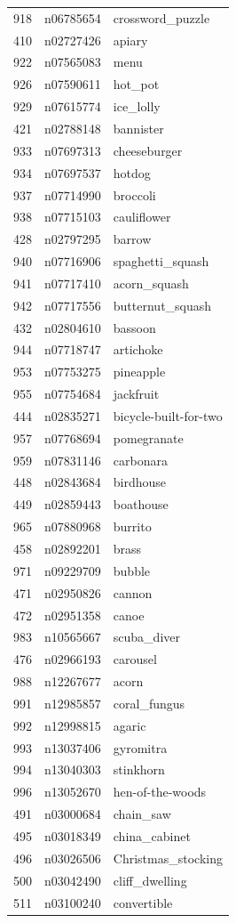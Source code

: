 \begin{table}
\begin{tabular}{cll}
918 & n06785654 & crossword_puzzle \\
410 & n02727426 & apiary \\
922 & n07565083 & menu \\
926 & n07590611 & hot_pot \\
929 & n07615774 & ice_lolly \\
421 & n02788148 & bannister \\
933 & n07697313 & cheeseburger \\
934 & n07697537 & hotdog \\
937 & n07714990 & broccoli \\
938 & n07715103 & cauliflower \\
428 & n02797295 & barrow \\
940 & n07716906 & spaghetti_squash \\
941 & n07717410 & acorn_squash \\
942 & n07717556 & butternut_squash \\
432 & n02804610 & bassoon \\
944 & n07718747 & artichoke \\
953 & n07753275 & pineapple \\
955 & n07754684 & jackfruit \\
444 & n02835271 & bicycle-built-for-two \\
957 & n07768694 & pomegranate \\
959 & n07831146 & carbonara \\
448 & n02843684 & birdhouse \\
449 & n02859443 & boathouse \\
965 & n07880968 & burrito \\
458 & n02892201 & brass \\
971 & n09229709 & bubble \\
471 & n02950826 & cannon \\
472 & n02951358 & canoe \\
983 & n10565667 & scuba_diver \\
476 & n02966193 & carousel \\
988 & n12267677 & acorn \\
991 & n12985857 & coral_fungus \\
992 & n12998815 & agaric \\
993 & n13037406 & gyromitra \\
994 & n13040303 & stinkhorn \\
996 & n13052670 & hen-of-the-woods \\
491 & n03000684 & chain_saw \\
495 & n03018349 & china_cabinet \\
496 & n03026506 & Christmas_stocking \\
500 & n03042490 & cliff_dwelling \\
511 & n03100240 & convertible \\
\bottomrule
\end{tabular}
\end{table}
